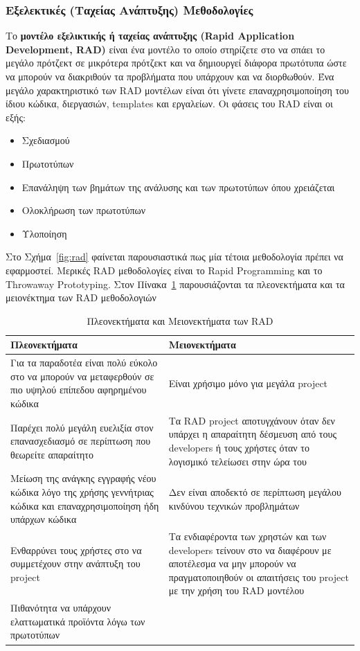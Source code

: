 \subsubsection{Εξελεκτικές (Ταχείας Ανάπτυξης) Μεθοδολογίες}

Το \textbf{μοντέλο εξελικτικής ή ταχείας ανάπτυξης (Rapid Application Development, RAD)} είναι ένα μοντέλο το οποίο στηρίζετε στο να σπάει το μεγάλο πρότζεκτ σε μικρότερα πρότζεκτ και να δημιουργεί διάφορα πρωτότυπα ώστε να μπορούν να διακριθούν τα προβλήματα που υπάρχουν και να διορθωθούν. Ένα μεγάλο χαρακτηριστικό των RAD μοντέλων είναι ότι γίνετε επαναχρησιμοποίηση του ίδιου κώδικα, διεργασιών, templates και εργαλείων.
Οι φάσεις του RAD είναι οι εξής:

\begin{itemize}
  \item Σχεδιασμού
  \item Πρωτοτύπων
  \item Επανάληψη των βημάτων της ανάλυσης και των πρωτοτύπων όπου χρειάζεται
  \item Ολοκλήρωση των πρωτοτύπων
  \item Υλοποίηση
\end{itemize}

Στο Σχήμα~\ref{fig:rad} φαίνεται παρουσιαστικά πως μία τέτοια μεθοδολογία πρέπει να εφαρμοστεί. Μερικές RAD μεθοδολογίες είναι το Rapid Programming και το Throwaway Prototyping. Στον Πίνακα~\ref{tab:rad} παρουσιάζονται τα πλεονεκτήματα και τα μειονέκτημα των RAD μεθοδολογιών

\begin{table}[H]
  \centering
  \begin{tabular}{| p{8cm} | p{8cm} |}
    \hline
    \textbf{Πλεονεκτήματα} & \textbf{Μειονεκτήματα} \\
    \hline
    Για τα παραδοτέα είναι πολύ εύκολο στο να μπορούν να μεταφερθούν σε πιο υψηλού επίπεδου αφηρημένου κώδικα & Είναι χρήσιμο μόνο για μεγάλα project \\
    \hline
    Παρέχει πολύ μεγάλη ευελιξία στον επανασχεδιασμό σε περίπτωση που θεωρείτε απαραίτητο & Τα RAD project αποτυγχάνουν όταν δεν υπάρχει η απαραίτητη δέσμευση από τους developers ή τους χρήστες όταν το λογισμικό τελείωσει στην ώρα του \\
    \hline
    Μείωση της ανάγκης εγγραφής νέου κώδικα λόγο της χρήσης γεννήτριας κώδικα και επαναχρησιμοποίηση ήδη υπάρχων κώδικα & Δεν είναι αποδεκτό σε περίπτωση μεγάλου κινδύνου τεχνικών προβλημάτων \\
    \hline
    Ενθαρρύνει τους χρήστες στο να συμμετέχουν στην ανάπτυξη του project & Τα ενδιαφέροντα των χρηστών και των developers τείνουν στο να διαφέρουν με αποτέλεσμα να μην μπορούν να πραγματοποιηθούν οι απαιτήσεις του project με την χρήση του RAD μοντέλου \\
    \hline
    Πιθανότητα να υπάρχουν ελαττωματικά προϊόντα λόγω των πρωτοτύπων & \\
    \hline
  \end{tabular}
  \caption{Πλεονεκτήματα και Μειονεκτήματα των RAD}
  \label{tab:rad}
\end{table}

